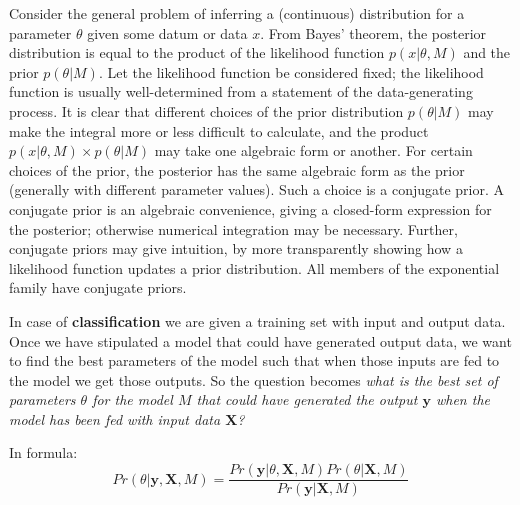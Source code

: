 \documentclass[12pt, letterpaper]{article}
\theoremstyle{definition}
\newcommand{\X}{\mathrm{\mathbf{X}}}
\newcommand{\y}{\mathbf{y}}
\begin{document}
Consider the general problem of inferring a (continuous) distribution for a parameter $\theta$ given some datum or data $x$. From Bayes' theorem, the posterior distribution is equal to the product of the likelihood function $p(x|\theta, M)$ and the prior $p(\theta|M)$. Let the likelihood function be considered fixed; the likelihood function is usually well-determined from a statement of the data-generating process. It is clear that different choices of the prior distribution $p(\theta|M)$ may make the integral more or less difficult to calculate, and the product $p(x|\theta,M) \times p(\theta|M)$ may take one algebraic form or another. For certain choices of the prior, the posterior has the same algebraic form as the prior (generally with different parameter values). Such a choice is a conjugate prior. A conjugate prior is an algebraic convenience, giving a closed-form expression for the posterior; otherwise numerical integration may be necessary. Further, conjugate priors may give intuition, by more transparently showing how a likelihood function updates a prior distribution.
All members of the exponential family have conjugate priors.

In case of \textbf{classification} we are given a training set with input and output data. Once we have stipulated a model that could have generated output data, we want to find the best parameters of the model such that when those inputs are fed to the model we get those outputs. So the question becomes \textit{what is the best set of parameters $\theta$ for the model $M$ that could have generated the output $\y$ when the model has been fed with input data $\X$?}

In formula:
\begin{equation}
\label{ClassBayes}
Pr(\theta|\y,\X,M) = \frac{Pr(\y|\theta,\X,M)Pr(\theta|\X, M)}{Pr(\y|\X,M)}
\end{equation}
\end{document}

